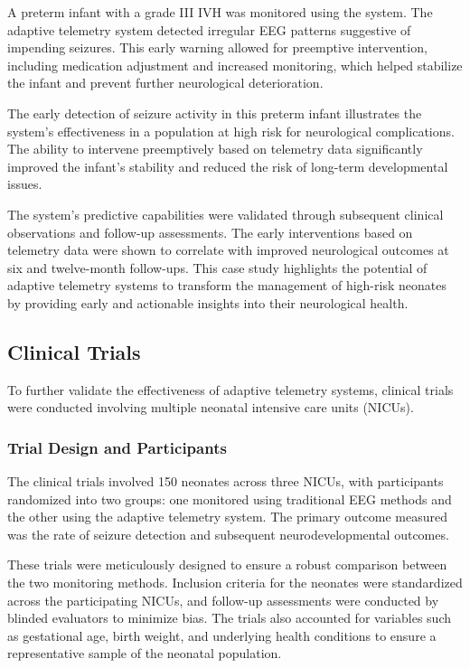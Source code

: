 \documentclass[12pt,journal,compsoc]{IEEEtran}
\begin{document}
A preterm infant with a grade III IVH was monitored using the system. The adaptive telemetry system detected irregular EEG patterns suggestive of impending seizures. This early warning allowed for preemptive intervention, including medication adjustment and increased monitoring, which helped stabilize the infant and prevent further neurological deterioration.

The early detection of seizure activity in this preterm infant illustrates the system's effectiveness in a population at high risk for neurological complications. The ability to intervene preemptively based on telemetry data significantly improved the infant's stability and reduced the risk of long-term developmental issues.

The system's predictive capabilities were validated through subsequent clinical observations and follow-up assessments. The early interventions based on telemetry data were shown to correlate with improved neurological outcomes at six and twelve-month follow-ups. This case study highlights the potential of adaptive telemetry systems to transform the management of high-risk neonates by providing early and actionable insights into their neurological health.

\subsection{Clinical Trials}

To further validate the effectiveness of adaptive telemetry systems, clinical trials were conducted involving multiple neonatal intensive care units (NICUs).

\subsubsection{Trial Design and Participants}

The clinical trials involved 150 neonates across three NICUs, with participants randomized into two groups: one monitored using traditional EEG methods and the other using the adaptive telemetry system. The primary outcome measured was the rate of seizure detection and subsequent neurodevelopmental outcomes.

These trials were meticulously designed to ensure a robust comparison between the two monitoring methods. Inclusion criteria for the neonates were standardized across the participating NICUs, and follow-up assessments were conducted by blinded evaluators to minimize bias. The trials also accounted for variables such as gestational age, birth weight, and underlying health conditions to ensure a representative sample of the neonatal population.
\end{document}
